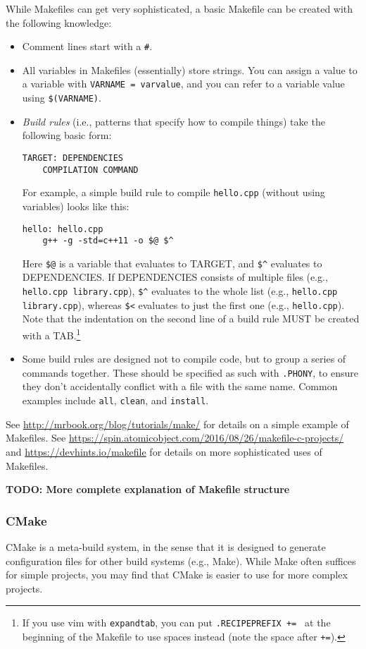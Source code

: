 \documentclass[12pt]{article}
\newcommand\red[1]{{\color{red}#1}}
\begin{document}
While Makefiles can get very sophisticated, a basic Makefile can be created with the following knowledge:
\begin{itemize}
    \item Comment lines start with a \texttt{\#}.
    \item All variables in Makefiles (essentially) store strings. You can assign a value to a variable with \texttt{VARNAME = varvalue}, and you can refer to a variable value using \texttt{\$(VARNAME)}.
    \item \emph{Build rules} (i.e., patterns that specify how to compile things) take the following basic form:
\begin{verbatim}
TARGET: DEPENDENCIES
    COMPILATION COMMAND
\end{verbatim}
        For example, a simple build rule to compile \texttt{hello.cpp} (without using variables) looks like this:
\begin{verbatim}
hello: hello.cpp
    g++ -g -std=c++11 -o $@ $^
\end{verbatim}
Here \verb+$@+ is a variable that evaluates to TARGET, and \verb+$^+ evaluates to DEPENDENCIES. If DEPENDENCIES consists of multiple files (e.g., \texttt{hello.cpp library.cpp}), \verb+$^+ evaluates to the whole list (e.g., \texttt{hello.cpp library.cpp}), whereas \verb+$<+ evaluates to just the first one (e.g., \texttt{hello.cpp}). Note that the indentation on the second line of a build rule MUST be created with a TAB.\footnote{If you use vim with \texttt{expandtab}, you can put \texttt{.RECIPEPREFIX += } at the beginning of the Makefile to use spaces instead (note the space after \texttt{+=}).}
    \item Some build rules are designed not to compile code, but to group a series of commands together. These should be specified as such with \texttt{.PHONY}, to ensure they don't accidentally conflict with a file with the same name. Common examples include \texttt{all}, \texttt{clean}, and \texttt{install}.
\end{itemize}
See \url{http://mrbook.org/blog/tutorials/make/} for details on a simple example of Makefiles. See \url{https://spin.atomicobject.com/2016/08/26/makefile-c-projects/} and \url{https://devhints.io/makefile} for details on more sophisticated uses of Makefiles.

\red{\textbf{TODO: More complete explanation of Makefile structure}}

\subsubsection{CMake}
CMake is a meta-build system, in the sense that it is designed to generate configuration files for other build systems (e.g., Make). While Make often suffices for simple projects, you may find that CMake is easier to use for more complex projects.
\end{document}
